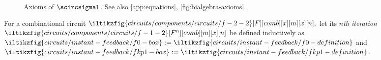 \begin{figure*}
    \centering
    \combinationalequationslist
    \begin{minipage}[b]{0.215\textwidth}
        \forkgateeqn
    \end{minipage}
    \hspace{-0.6em}
    \begin{minipage}[b]{0.174\textwidth}
        \stubgateeqn
    \end{minipage}
    \hspace{-0.6em}
    \begin{minipage}[b]{0.171\textwidth}
        \stubdelayeqn
    \end{minipage}
    \hspace{-0.6em}
    \begin{minipage}[b]{0.164\textwidth}
        \forkjoininverseeqn
    \end{minipage}
    \hspace{-0.6em}
    \begin{minipage}[b]{0.2714\textwidth}
        \streamingeqn
    \end{minipage}
    \begin{minipage}[b]{0.16\textwidth}
        \disconnecteqn
    \end{minipage}
    \begin{minipage}[b]{0.2\textwidth}
        \forkdelayeqn
    \end{minipage}
    \begin{minipage}[b]{0.2\textwidth}
        \joindelayeqn
    \end{minipage}
    \begin{minipage}[b]{0.19\textwidth}
        \instantfeedbackeqn
    \end{minipage}
    \begin{minipage}[b]{0.21\textwidth}
        \delaydiscardeqn
    \end{minipage}
    \caption{
        Axioms of \(\scircsigmal\).
        See also \cref{app:equations}, \cref{fig:bialgebra-axioms}.
    }
    \label{fig:local-equations}
\end{figure*}

\begin{definition}
    For a combinational circuit \(
        \iltikzfig{circuits/components/circuits/f-2-2}[F][comb][x][m][x][n],
    \)
    let its \emph{\(n\)th iteration} \(
        \iltikzfig{circuits/components/circuits/f-1-2}[F^n][comb][m][x][n]
    \) be defined inductively as \(
        \iltikzfig{circuits/instant-feedback/f0-box}
        :=
        \iltikzfig{circuits/instant-feedback/f0-definition}
    \) and \(
        \iltikzfig{circuits/instant-feedback/fkp1-box}
        :=
        \iltikzfig{circuits/instant-feedback/fkp1-definition}
    \).
\end{definition}

